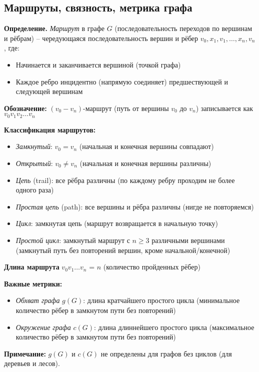 \subsection{Маршруты, связность, метрика графа}

\noindent\textbf{Определение.} \textit{Маршрут} в графе $G$ (последовательность переходов по вершинам и рёбрам) -- чередующаяся последовательность вершин и рёбер $v_0, x_1, v_1, \ldots, x_n, v_n$, где:
\begin{itemize}[noitemsep,topsep=0pt]
\item Начинается и заканчивается вершиной (точкой графа)
\item Каждое ребро инцидентно (напрямую соединяет) предшествующей и следующей вершинам
\end{itemize}

\noindent\textbf{Обозначение:} $(v_0-v_n)$-маршрут (путь от вершины $v_0$ до $v_n$) записывается как $v_0 v_1 v_2 \ldots v_n$

\noindent\textbf{Классификация маршрутов:}
\begin{itemize}[noitemsep,topsep=0pt]
\item \textit{Замкнутый}: $v_0 = v_n$ (начальная и конечная вершины совпадают)
\item \textit{Открытый}: $v_0 \neq v_n$ (начальная и конечная вершины различны)
\item \textit{Цепь} (trail): все рёбра различны (по каждому ребру проходим не более одного раза)
\item \textit{Простая цепь} (path): все вершины и рёбра различны (нигде не повторяемся)
\item \textit{Цикл}: замкнутая цепь (маршрут возвращается в начальную точку)
\item \textit{Простой цикл}: замкнутый маршрут с $n \geq 3$ различными вершинами (замкнутый путь без повторений вершин, кроме начальной/конечной)
\end{itemize}

\noindent\textbf{Длина маршрута} $v_0 v_1 \ldots v_n$ = $n$ (количество пройденных рёбер)

\noindent\textbf{Важные метрики:}
\begin{itemize}[noitemsep,topsep=0pt]
\item \textit{Обхват графа} $g(G)$: длина кратчайшего простого цикла (минимальное количество рёбер в замкнутом пути без повторений)
\item \textit{Окружение графа} $c(G)$: длина длиннейшего простого цикла (максимальное количество рёбер в замкнутом пути без повторений)
\end{itemize}

\noindent\textbf{Примечание:} $g(G)$ и $c(G)$ не определены для графов без циклов (для деревьев и лесов).